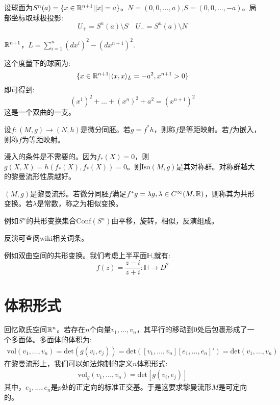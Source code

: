 \begin{example}[球面]
    设球面为$S^n(a)=\{x\in \mathbb{R}^{n+1}||x|=a\}$。$N=(0,0,\dots,a)$,$S=(0,0,\dots,-a)$。局部坐标取球极投影:
    $$
    U_{+} =S^n(a) \setminus S                \quad U_{-}=S^n(a)\setminus N
    $$

\end{example}
\begin{example}[Minkowski空间]
    $\mathbb{R}^{n+1}$，$L=\sum_{i=1}^n(dx^i)^2-(dx^{n+1})^2$.

    这个度量下的球面为:
    $$
    \{x \in \mathbb{R}^{n+1}|\langle x,x \rangle _L=-a^2,x^{n+1}>0\}
    $$
    即可得到:
    $$
    (x^1)^2+\dots+(x^n)^2+a^2=(x^{n+1})^2
    $$
    这是一个双曲的一支。
\end{example}
\begin{definition}[等距]
设$f:(M,g) \to (N,h)$是微分同胚。若$g=f^*h$，则称$f$是等距映射。若$f$为嵌入，则称$f$为等距映射。
\end{definition}
浸入的条件是不需要的。因为$f_*(X)=0$，则$g(X,X)=h(f_*(X),f_*(X))=0$。则$\mathrm{Iso}(M,g)$是其对称群。对称群越大的黎曼流形性质越好。

\begin{definition}[共形变换]
    $(M,g)$是黎曼流形。若微分同胚$f$满足$f^* g=\lambda g,\lambda \in C^{\infty}(M,\mathbb{R})$，则称其为共形变换。若$\lambda$是常数，称之为相似变换。
\end{definition}
\begin{example}
    例如$S^n$的共形变换集合$\mathrm{Conf}(S^n)$由平移，旋转，相似，反演组成。
    
    反演可查阅wiki相关词条。
\end{example}
\begin{example}
    例如双曲空间的共形变换。我们考虑上半平面$\mathbb{H}$,就有:
    $$
    f(z)=\frac{z-i}{z+i}:\mathbb{H} \to D^2
    $$
\end{example}
\section{体积形式}
回忆欧氏空间$\mathbb{R}^n$。若存在$n$个向量$v_1,\dots,v_n$，其平行的移动到$0$处后包裹形成了一个多面体。多面体的体积为:
\begin{align*}
    \mathrm{vol}(v_1,\dots,v_n)=\mathrm{det}(g(v_i,e_j))=\mathrm{det}([v_1,\dots,v_n][e_1,\dots,e_n]')=\mathrm{det}(v_1,\dots,v_n)
\end{align*}
在黎曼流形上，我们可以如法炮制的定义$n$体积形式:
\begin{align*}
    \mathrm{vol}_g(v_1,\dots,v_n)=\mathrm{det}[g(v_i,e_j)]
\end{align*}
其中，$e_1,\dots,e_n$是$p$处的正定向的标准正交基。于是这要求黎曼流形$M$是可定向的。

